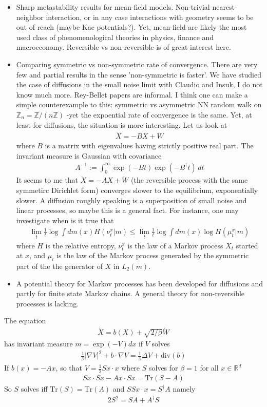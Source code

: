 \documentclass[reqno]{amsart}
\newcounter{as}[section]
\newcommand{\bb}[1]{{\mathbb #1}}
\newcommand{\<}{\langle}
\renewcommand{\>}{\rangle}
\newcommand{\bel}[2]{\begin{equation} \label{#1} \begin{split} #2
 					\end{split} \end{equation}}
\begin{document}
\begin{itemize}
	\item Sharp metastability results for mean-field models. Non-trivial nearest-neighbor interaction, or in any case interactions with geometry seems to be out of reach (maybe Kac potentials?). Yet, mean-field are likely the most used class of phenomenological theories in physics, finance and macroeconomy. Reversible vs non-reversible is of great interest here.
	
	\item Comparing symmetric vs non-symmetric rate of convergence. There are very few and partial results in the sense 'non-symmetric is faster'. We have studied the case of diffusions in the small noise limit with Claudio and Insuk, I do not know much more. Rey-Bellet papers are informal. I think one can make a simple counterexample to this: symmetric vs asymmetric NN random walk on $\bb Z_n=\bb Z/(n\bb Z)$ -yet the expoential rate of convergence is the same. Yet, at least for diffusions, the situation is more interesting. Let us look at
	\bel{e:va}{
\dot X = -B X +\dot W	
}
 where $B$ is a matrix with eigenvalues having strictly positive real part. The invariant measure is Gaussian with covariance
 \bel{e:a}{
A^{-1}:=\int_0^\infty \exp(- B t) \exp(-B^\dagger t) \,dt
}	
It seems to me that $\dot X=-AX+\dot W$ (the reversible process with the same symmetirc Dirichlet form) converges slower to the equilibrium, exponentially slower. A diffusion roughly speaking is a superposition of small noise and linear processes, so maybe this is a general fact. For instance, one may investigate when is it true that
\bel{e:asfd}{
\lim_t \tfrac{1}{t} \log \int dm(x) H(\nu_t^x|m) \le \lim_t \tfrac{1}{t}\log \int dm(x) \log H(\mu_t^x|m)
}
where $H$ is the relative entropy, $\nu_t^x$ is the law of a Markov process $X_t$ started at $x$, and $\mu_t$ is the law of the Markov process generated by the symmetric part of the the generator of $X$ in $L_2(m)$.


\item A potential theory for Markov processes has been developed for diffusions and partly for finite state Markov chains. A general theory for non-reversible processes is lacking.
\end{itemize}



\newpage

The equation
\bel{e:sa}{
\dot X=b(X)+\sqrt{2/\beta} \dot W
}
has invariant measure $m=\exp(- V) dx$ if $V$ solves
\bel{e:visco}{
\tfrac{1}\beta |\nabla V|^2 + b \cdot \nabla V=\tfrac{1}\beta \Delta V+\mathrm{div}(b)
}
If $b(x)=-A x$, so that $V=\tfrac 12 Sx \cdot x$ where $S$ solves for $\beta=1$ for all $x\in \bb R^d$
\bel{e:fad}{
Sx \cdot Sx -A x \cdot Sx=\mathrm{Tr}(S-A)
}
So $S$ solves iff $\mathrm{Tr}(S)=\mathrm{Tr}(A)$ and $S S x \cdot x= S^\dagger A$ namely
\bel{e:fasfd}{
2 S^2= S A + A^\dagger S
}
\end{document}
